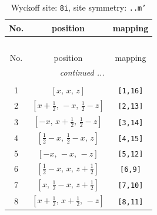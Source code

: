 \documentclass[fleqn,8pt]{jsarticle}
\begin{document}
\begin{longtable}{ccc}
\caption{Wyckoff site: {\tt 8i}, site symmetry: {\tt ..m'}}
 \\
 \hline \hline
No. & position & mapping \\ \hline \endfirsthead

\multicolumn{2}{l}{\tablename\ \thetable{}} \\
 \hline \hline
No. & position & mapping \\ \hline \endhead

 \hline \hline
\multicolumn{2}{r}{\footnotesize\it continued ...} \\ \endfoot

 \hline \hline
\multicolumn{2}{r}{} \\ \endlastfoot

1 & $\left[ x,\, x,\, z \right]$ & {\tt [1,16]} \\ \hline
2 & $\left[ x + \frac{1}{2},\, - x,\, \frac{1}{2} - z \right]$ & {\tt [2,13]} \\ \hline
3 & $\left[ - x,\, x + \frac{1}{2},\, \frac{1}{2} - z \right]$ & {\tt [3,14]} \\ \hline
4 & $\left[ \frac{1}{2} - x,\, \frac{1}{2} - x,\, z \right]$ & {\tt [4,15]} \\ \hline
5 & $\left[ - x,\, - x,\, - z \right]$ & {\tt [5,12]} \\ \hline
6 & $\left[ \frac{1}{2} - x,\, x,\, z + \frac{1}{2} \right]$ & {\tt [6,9]} \\ \hline
7 & $\left[ x,\, \frac{1}{2} - x,\, z + \frac{1}{2} \right]$ & {\tt [7,10]} \\ \hline
8 & $\left[ x + \frac{1}{2},\, x + \frac{1}{2},\, - z \right]$ & {\tt [8,11]} \\
\end{longtable}
\renewcommand{\arraystretch}{1.2}
\end{document}
